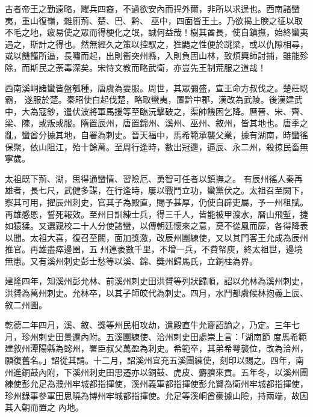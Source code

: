 
\begin{pinyinscope}

 古者帝王之勤遠略，耀兵四裔，不過欲安內而捍外爾，非所以求逞也。西南諸蠻夷，重山復嶺，雜廁荊、楚、巴、黔、
 巫中，四面皆王土。乃欲揭上腴之征以取不毛之地，疲易使之眾而得梗化之氓，誠何益哉！樹其酋長，使自鎮撫，始終蠻夷遇之，斯計之得也。然無經久之策以控馭之，狌鼯之性便於跳梁，或以仇隙相尋，或以饑饉所逼，長嘯而起，出則衝突州縣，入則負固山林，致煩興師討捕，雖能殄除，而斯民之荼毒深矣。宋恃文教而略武衛，亦豈先王制荒服之道哉！



 西南溪峒諸蠻皆盤瓠種，唐虞為要服。周世，其眾彌盛，宣王命方叔伐之。楚莊既霸，
 遂服於楚。秦昭使白起伐楚，略取蠻夷，置黔中郡，漢改為武陵。後漢建武中，大為寇鈔，遣伏波將軍馬援等至臨沅擊破之，渠帥饑困乞降。曆晉、宋、齊、梁、陳，或叛或服。隋置辰州，唐置錦州、溪州、巫州、敘州，皆其地也。唐季之亂，蠻酋分據其地，自署為刺史。晉天福中，馬希範承襲父業，據有湖南，時蠻徭保聚，依山阻江，殆十餘萬。至周行逢時，數出冠邊，逼辰、永二州，殺掠民畜無寧歲。



 太祖既下荊、湖，思得通蠻情、習險厄、勇智可任者以鎮撫之。
 有辰州徭人秦再雄者，長七尺，武健多謀，在行逢時，屢以戰鬥立功，蠻黨伏之。太祖召至闕下，察其可用，擢辰州刺史，官其子為殿直，賜予甚厚，仍使自辟吏屬，予一州租賦。再雄感恩，誓死報效。至州日訓練士兵，得三千人，皆能被甲渡水，曆山飛塹，捷如猿猱。又選親校二十人分使諸蠻，以傳朝廷懷來之意，莫不從風而靡，各得降表以聞。太祖大喜，復召至闕，面加獎激，改辰州團練使，又以其門客王允成為辰州推官。再雄盡瘁邊圉，五
 州連袤數千里，不增一兵，不費帑庾，終太祖世，邊境無患。又有溪州刺史彭士愁等以溪、錦、獎州歸馬氏，立銅柱為界。



 建隆四年，知溪州彭允林、前溪州刺史田洪贇等列狀歸順，詔以允林為溪州刺史，洪贇為萬州刺史。允林卒，以其子師皎代為刺史。四月，水鬥都虞候林抱義上辰、敘二州圖。



 乾德二年四月，溪、敘、獎等州民相攻劫，遣殿直牛允齎詔諭之，乃定。三年七月，珍州刺史田景遷內附。五溪團練使、洽州刺史田處崇上言：「湖南節
 度馬希範建敘州潭陽縣為懿州，署臣叔父萬盈為刺史。希範卒，其弟希萼襲位，改為洽州，願復舊名。」詔從其請。十二月，詔溪州宜充五溪團練使，刻印以賜之。四年，南州進銅鼓內附，下溪州刺史田思遷亦以銅鼓、虎皮、麝臍來貢。五年冬，以溪州團練使彭允足為濮州牢城都指揮使，溪州義軍都指揮使彭允賢為衛州牢城都指揮使，珍州錄事參軍田思曉為博州牢城都指揮使。允足等溪峒酋豪據山險，持兩端，故因其入朝而置之
 內地。




\end{pinyinscope}
